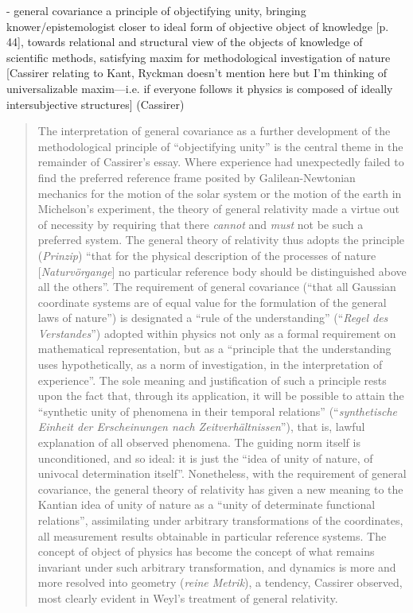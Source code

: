 \begin{quote}
    \citep[p. 40-41]{Ryckman2005}
\end{quote}


- general covariance a principle of objectifying unity, bringing knower/epistemologist closer to ideal form of objective object of knowledge [p. 44], towards relational and structural view of the objects of knowledge of scientific methods, satisfying maxim for methodological investigation of nature [Cassirer relating to Kant, Ryckman doesn't mention here but I'm thinking of universalizable maxim---i.e. if everyone follows it physics is composed of ideally intersubjective structures] (Cassirer)


\begin{quote}
    The interpretation of general covariance as a further development of the methodological principle of ``objectifying unity'' is the central theme in the remainder of Cassirer's essay.  Where experience had unexpectedly failed to find the preferred reference frame posited by Galilean-Newtonian mechanics for the motion of the solar system or the motion of the earth in Michelson's experiment, the theory of general relativity made a virtue out of necessity by requiring that there \emph{cannot} and \emph{must} not be such a preferred system.  The general theory of relativity thus adopts the principle (\emph{Prinzip}) ``that for the physical description of the processes of nature [\emph{Naturv\"organge}] no particular reference body should be distinguished above all the others''.  The requirement of general covariance (``that all Gaussian coordinate systems are of equal value for the formulation of the general laws of nature'') is designated a ``rule of the understanding'' (``\emph{Regel des Verstandes}'') adopted within physics not only as a formal requirement on mathematical representation, but as a ``principle that the understanding uses hypothetically, as a norm of investigation, in the interpretation of experience''.  The sole meaning and justification of such a principle rests upon the fact that, through its application, it will be possible to attain the ``synthetic unity of phenomena in their temporal relations'' (``\emph{synthetische Einheit der Erscheinungen nach Zeitverh\"altnissen}''), that is, lawful explanation of all observed phenomena.  The guiding norm itself is unconditioned, and so ideal: it is just the ``idea of unity of nature, of univocal determination itself''.  Nonetheless, with the requirement of general covariance, the general theory of relativity has given a new meaning to the Kantian idea of unity of nature as a ``unity of determinate functional relations'', assimilating under arbitrary transformations of the coordinates, all measurement results obtainable in particular reference systems.  The concept of object of physics has become the concept of what remains invariant under such arbitrary transformation, and dynamics is more and more resolved into geometry (\emph{reine Metrik}), a tendency, Cassirer observed, most clearly evident in Weyl's treatment of general relativity.
    
    \citep[p. 43]{Ryckman2005}
\end{quote}

